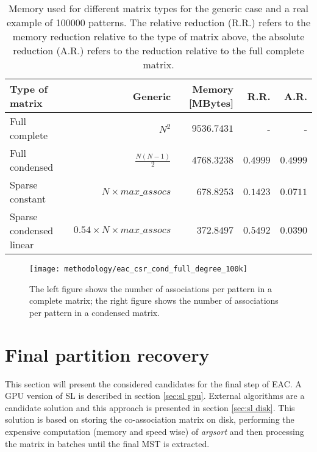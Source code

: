 \begin{table}[hbtp]
\centering
\caption{Memory used for different matrix types for the generic case and a real example of 100000 patterns. The relative reduction (R.R.) refers to the memory reduction relative to the type of matrix above, the absolute reduction (A.R.) refers to the reduction relative to the full complete matrix.}
\label{tab:mat type memory}
\begin{tabular}{lrrrr}
\toprule
\textbf{Type of matrix}          & \textbf{Generic}                & \textbf{Memory {[}MBytes{]}}    & \textbf{R.R.} & \textbf{A.R.} \\
\midrule%
Full complete           & $N^2$                  & $9536.7431$              & -                  & -             \\
Full condensed          & $\frac{N(N-1)}{2}$     & $4768.3238$              & $0.4999$     & $0.4999$      \\
Sparse constant         & $ N \times max\_assocs$ & $678.8253$               & $0.1423$           & $0.0711$      \\
Sparse condensed linear & $ 0.54 \times N \times max\_assocs$ & $372.8497$               & $0.5492$           & $0.0390$      \\
\bottomrule
\end{tabular}
\end{table}


\begin{figure}[hbtp]
\centering
\texttt{[image: methodology/eac\_csr\_cond\_full\_degree\_100k]}
\caption{The left figure shows the number of associations per pattern in a complete matrix; the right figure shows the number of associations per pattern in a condensed matrix.}
\label{fig:coassoc degree}
\end{figure}


\section{Final partition recovery}

This section will present the considered candidates for the final step of EAC.
A GPU version of SL is described in section \ref{sec:sl gpu}.
External algorithms are a candidate solution and this approach is presented in section \ref{sec:sl disk}.
This solution is based on storing the co-association matrix on disk, performing the expensive computation (memory and speed wise) of \emph{argsort} and then processing the matrix in batches until the final MST is extracted.

